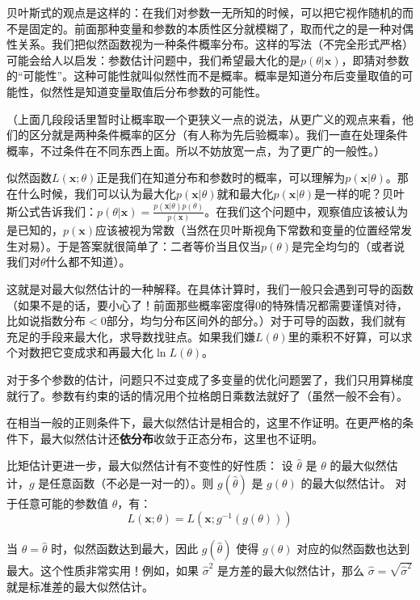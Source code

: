 贝叶斯式的观点是这样的：在我们对参数一无所知的时候，可以把它视作随机的而不是固定的。前面那种变量和参数的本质性区分就模糊了，取而代之的是一种对偶性关系。我们把似然函数视为一种条件概率分布。这样的写法（不完全形式严格）可能会给人以启发：参数估计问题中，我们希望最大化的是$p(\theta|\mathbf{x})$，即猜对参数的“可能性”。这种可能性就叫似然性而不是概率。概率是知道分布后变量取值的可能性，似然性是知道变量取值后分布参数的可能性。

（上面几段段话里暂时让概率取一个更狭义一点的说法，从更广义的观点来看，他们的区分就是两种条件概率的区分（有人称为先后验概率）。我们一直在处理条件概率，不过条件在不同东西上面。所以不妨放宽一点，为了更广的一般性。）

似然函数$L(\mathbf{x};\theta)$正是我们在知道分布和参数时的概率，可以理解为$p(\mathbf{x}|\theta)$。那在什么时候，我们可以认为最大化$p(\mathbf{x}|\theta)$就和最大化$p(\mathbf{x}|\theta)$是一样的呢？贝叶斯公式告诉我们：$p(\theta|\mathbf{x})= \frac{p(\mathbf{x}|\theta)p(\theta)}{p(\mathbf{x})}$。在我们这个问题中，观察值应该被认为是已知的，$p(\mathbf{x})$应该被视为常数（当然在贝叶斯视角下常数和变量的位置经常发生对易）。于是答案就很简单了：二者等价当且仅当$p(\theta)$是完全均匀的（或者说我们对$\theta$什么都不知道）。

这就是对最大似然估计的一种解释。在具体计算时，我们一般只会遇到可导的函数（如果不是的话，要小心了！前面那些概率密度得$0$的特殊情况都需要谨慎对待，比如说指数分布$<0$部分，均匀分布区间外的部分。）对于可导的函数，我们就有充足的手段来最大化，求导数找驻点。如果我们嫌$L(\theta)$里的乘积不好算，可以求个对数把它变成求和再最大化$\ln L(\theta)$。

对于多个参数的估计，问题只不过变成了多变量的优化问题罢了，我们只用算梯度就行了。参数有约束的话的情况用个拉格朗日乘数法就好了（虽然一般不会有）。

在相当一般的正则条件下，最大似然估计是相合的，这里不作证明。在更严格的条件下，最大似然估计还\textbf{依分布}收敛于正态分布，这里也不证明。

比矩估计更进一步，最大似然估计有不变性的好性质：
设 $\hat{\theta}$ 是 $\theta$ 的最大似然估计，$g$ 是任意函数（不必是一对一的）。则 $g(\hat{\theta})$ 是 $g(\theta)$ 的最大似然估计。
对于任意可能的参数值 $\theta$，有：
\[
L(\mathbf{x};\theta)=L(\mathbf{x};g^{−1}(g(\theta)))
\]

当 $\theta = \hat{\theta}$ 时，似然函数达到最大，因此 $g(\hat{\theta})$ 使得 $g(\theta)$ 对应的似然函数也达到最大。这个性质非常实用！例如，如果 $\hat{\sigma}^2$ 是方差的最大似然估计，那么 $\hat{\sigma} = \sqrt{\hat{\sigma}^2}$ 就是标准差的最大似然估计。

